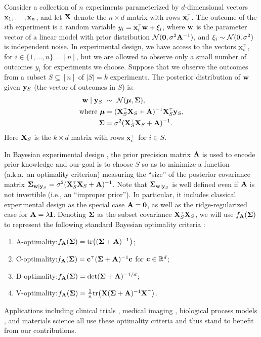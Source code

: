 \documentclass[11pt]{article}
\newcommand{\mub}{\bm{\mu}}
\begin{document}
Consider a collection of $n$ experiments parameterized by
$d$-dimensional vectors $\mathbf x_1,\dots,\mathbf x_n$, and let $\mathbf X$ denote the
$n\times d$ matrix with rows $\x_i^\top$. The outcome of the $i$th
experiment is a random variable $y_i = \x_i^\top\w + \xi_i$, where
$\mathbf w$ is the parameter vector of a linear model with prior distribution
$\mathcal{N}(\mathbf 0,\sigma^2\mathbf A^{-1})$, and $\xi_i\sim \mathcal{N}(0,\sigma^2)$ is
independent noise. In experimental design, we have access to the vectors 
$\x_i^\top$, for $i\in\{1,\ldots,n\} = [n]$, but we are allowed to
observe only a small number of outcomes $y_i$ for experiments we choose.
Suppose that we observe the outcomes from a subset
$S\subseteq [n]$ of $\lvert S \vert = k$ experiments. The
posterior distribution of $\mathbf w$ given $\mathbf y_S$ (the vector of outcomes in $S$) is:
\begin{align*}
  \w\mid \y_S \ &\sim\ \Nc(\mub, \Sigmab), \\
  \text{where } \mub &= (\X_S^\top\X_S + \A)^{-1}\X_S^\top\y_S, \\
  \Sigmab &= \sigma^2(\X_S^\top\X_S+\A)^{-1}.
\end{align*}
Here $\mathbf X_S$ is the $k\times d$ matrix with rows $\x_i^\top$ for
$i\in S$.

In Bayesian experimental design \citep{bayesian-design-review},
the prior precision matrix $\mathbf A$ is used to encode prior knowledge
and our goal is to choose $S$ so as to 
  minimize a function (a.k.a.~an optimality criterion) measuring the ``size''
  of the posterior covariance matrix
  $\Sigmab_{\w\mid\y_S} = \sigma^2(\X_S^\top\X_S+\A)^{-1}$.
Note that $\mathbf{\Sigma}_{\mathbf w\mid\mathbf y_S}$ is well defined even if $\mathbf A$ is not
invertible (i.e., an ``improper prior''). In particular, it includes classical
experimental design as the special case $\mathbf A = \mathbf 0$, as well as
the ridge-regularized case for $\mathbf A=\lambda\mathbf I$.
Denoting $\mathbf{\Sigma}$ as the subset covariance $\X_S^\top\X_S$, we will
use $f_{\mathbf A}(\mathbf{\Sigma})$ to represent the following standard Bayesian 
optimality criteria \citep{bayesian-design-review,optimal-design-pukelsheim}:
\begin{enumerate}
\item A-optimality:\quad $f_{\mathbf A}(\mathbf{\Sigma}) = \mathrm{tr}\big((\mathbf{\Sigma}+\mathbf A)^{-1}\big)$;
\item C-optimality:\quad \!\!$f_{\A}(\Sigmab) = \cb^\top(\Sigmab+\A)^{-1}\cb$ for
$\mathbf{c} \in \mathbb R^d$;
\item D-optimality:\quad $f_{\mathbf A}(\mathbf{\Sigma}) = \det(\mathbf{\Sigma}+\mathbf A)^{-1/d}$;
  \item V-optimality:\quad $f_{\A}(\Sigmab) =
    \frac1n\tr\big(\X(\Sigmab+\A)^{-1}\X^\top\big)$.
  \end{enumerate}
  Applications including clinical trials
  \citep{ryan2015fully,ding2008bayesian,spiegelhalter2004incorporating,berry2002adaptive,stangl1998bayesian,flournoy1993clinical},
  medical imaging \citep{owen2016optimisation},
  biological process models \citep{ryan2016optimal},
  and materials science
  \citep{frazier2016bayesian,ueno2016combo,terejanu2012bayesian}
  all use these optimality criteria and thus stand to benefit from
  our contributions.
\end{document}
